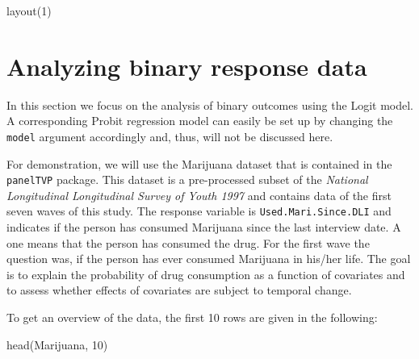 \documentclass[a4paper, preprint, 3p,
authoryear]{elsarticle} %
\newenvironment{Shaded}{\begin{snugshade}}{\end{snugshade}}
\newcommand{\NormalTok}[1]{#1}
\begin{document}
\begin{Shaded}
\begin{Highlighting}[]
\NormalTok{layout(1)}
\end{Highlighting}
\end{Shaded}

\section{Analyzing binary response
data}\label{analyzing-binary-response-data}

In this section we focus on the analysis of binary outcomes using the
Logit model. A corresponding Probit regression model can easily be set
up by changing the \texttt{model} argument accordingly and, thus, will
not be discussed here.

For demonstration, we will use the Marijuana dataset that is contained
in the \texttt{panelTVP} package. This dataset is a pre-processed subset
of the \textit{National Longitudinal Longitudinal Survey of Youth 1997}
and contains data of the first seven waves of this study. The response
variable is \texttt{Used.Mari.Since.DLI} and indicates if the person has
consumed Marijuana since the last interview date. A one means that the
person has consumed the drug. For the first wave the question was, if
the person has ever consumed Marijuana in his/her life. The goal is to
explain the probability of drug consumption as a function of covariates
and to assess whether effects of covariates are subject to temporal
change.

To get an overview of the data, the first 10 rows are given in the
following:

\begin{Shaded}
\begin{Highlighting}[]
\NormalTok{head(Marijuana, 10)}
\end{Highlighting}
\end{Shaded}
\end{document}
